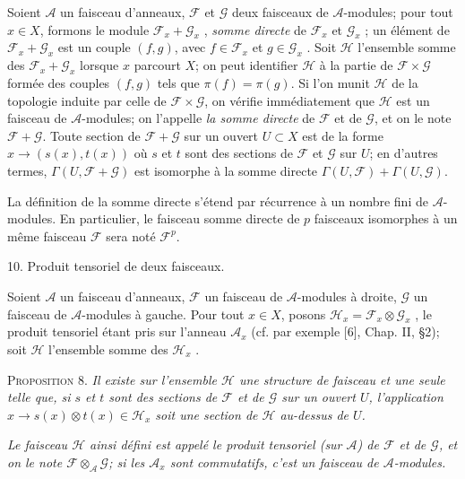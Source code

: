 Soient $\mathcal{A}$ un faisceau d'anneaux, $\mathcal{F}$ et $\mathcal{G}$ deux faisceaux de $\mathcal{A}$-modules; pour tout $x \in X$, formons le module $\mathcal{F}_x + \mathcal{G}_x$ , \textit{somme directe} de $\mathcal{F}_x$ et $\mathcal{G}_x$ ; un élément de $\mathcal{F}_x + \mathcal{G}_x$ est un couple $(f, g)$, avec $f \in \mathcal{F}_x$ et $g \in \mathcal{G}_x$ . Soit $\mathcal{H}$ l'ensemble somme des $\mathcal{F}_x + \mathcal{G}_x$ lorsque $x$ parcourt $X$; on peut identifier $\mathcal{H}$ à la partie de $\mathcal{F} \times \mathcal{G}$ formée des couples $(f, g)$ tels que $\pi(f) = \pi(g)$. Si l'on munit $\mathcal{H}$ de la topologie induite par celle de $\mathcal{F} \times \mathcal{G}$, on vérifie immédiatement que $\mathcal{H}$ est un faisceau de $\mathcal{A}$-modules; on l'appelle \textit{la somme directe} de $\mathcal{F}$ et de $\mathcal{G}$, et on le note $\mathcal{F} + \mathcal{G}$. Toute section de $\mathcal{F} + \mathcal{G}$ sur un ouvert $U \subset X$ est de la forme $x \to (s(x), t(x))$ où $s$ et $t$ sont des sections de $\mathcal{F}$ et $\mathcal{G}$ sur $U$; en d'autres termes, $\Gamma(U, \mathcal{F} + \mathcal{G})$ est isomorphe à la somme directe $\Gamma(U, \mathcal{F}) + \Gamma(U, \mathcal{G})$.

La définition de la somme directe s'étend par récurrence à un nombre fini de $\mathcal{A}$-modules. En particulier, le faisceau somme directe de $p$ faisceaux isomorphes à un même faisceau $\mathcal{F}$ sera noté $\mathcal{F}^p$.


10. Produit tensoriel de deux faisceaux.

Soient $\mathcal{A}$ un faisceau d'anneaux, $\mathcal{F}$ un faisceau de $\mathcal{A}$-modules à droite, $\mathcal{G}$ un faisceau de $\mathcal{A}$-modules à gauche. Pour tout $x \in X$, posons $\mathcal{H}_x = \mathcal{F}_x \otimes \mathcal{G}_x$ , le produit tensoriel étant pris sur l'anneau $\mathcal{A}_x$ (cf. par exemple [6], Chap. II, \S2); soit $\mathcal{H}$ l'ensemble somme des $\mathcal{H}_x$ .

\textsc{Proposition} 8. \textit{Il existe sur l'ensemble $\mathcal{H}$ une structure de faisceau et une seule telle que, si $s$ et $t$ sont des sections de $\mathcal{F}$ et de $\mathcal{G}$ sur un ouvert $U$, l'application $x \to s(x) \otimes t(x) \in \mathcal{H}_x$ soit une section de $\mathcal{H}$ au-dessus de $U$.}

\textit{Le faisceau $\mathcal{H}$ ainsi défini est appelé le produit tensoriel (sur $\mathcal{A}$) de $\mathcal{F}$ et de $\mathcal{G}$, et on le note $\mathcal{F} \otimes_{\mathcal{A}} \mathcal{G}$; si les $\mathcal{A}_x$ sont commutatifs, c'est un faisceau de $\mathcal{A}$-modules.}


